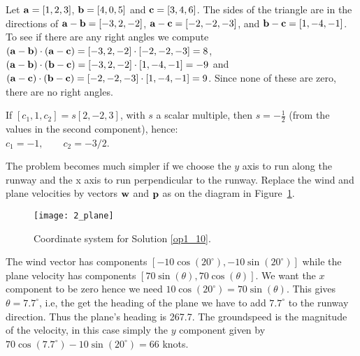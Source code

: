 \vspace{2mm}
Let $\aa=[1,2,3]$, $\bb=[4,0,5]$ and $\cc=[3,4,6]$. The sides of the triangle
are in the directions of $\aa-\bb=[-3,2,-2]$, $\aa-\cc=[-2,-2,-3]$,
and $\bb-\cc=[1,-4,-1]$. To see if there
are any right angles we compute
$(\aa-\bb)\cdot(\aa-\cc)=[-3,2,-2]\cdot[-2,-2,-3]=8$,
$(\aa-\bb)\cdot(\bb-\cc)=[-3,2,-2]\cdot[1,-4,-1]=-9$ and
$(\aa-\cc)\cdot(\bb-\cc)=[-2,-2,-3]\cdot[1,-4,-1]=9$.
Since none of these are zero, there are no right angles.

\vspace{2mm}
If $[c_1, 1, c_2] = s[2, -2, 3]$, with $s$ a scalar multiple, then $s=-\frac{1}{2}$ (from the values in the second component), hence: \\
$c_1=-1,\qquad c_2 = -3/2$.

\vspace{2mm}
The problem becomes much simpler if we choose the $y$ axis to run
along the runway and the x axis to run perpendicular to the runway. Replace
the wind and plane velocities by vectors ${\bf w}$ and ${\bf p}$ as on the
diagram in Figure~\ref{fig_plane}.

\begin{figure}
\centerline{\texttt{[image: 2\_plane]}}
\caption{Coordinate system for Solution \ref{op1_10}. \label{fig_plane}}
\end{figure}

The wind vector has components $[-10\cos(20^\circ ), -10\sin(20^\circ )]$
while the plane velocity has components $[70\sin(\theta), 70\cos(\theta)]$.
We want the $x$ component to be zero hence we need
$10\cos(20^\circ)=70\sin(\theta)$. This gives $\theta = 7.7^\circ$, i.e,
the get the heading of the plane we have to add $7.7^\circ$ to the runway
direction. Thus the plane's heading is 267.7. The groundspeed is the magnitude
of the velocity, in this case simply the $y$ component given by
$70\cos(7.7^\circ)-10\sin(20^\circ)= 66$ knots.

